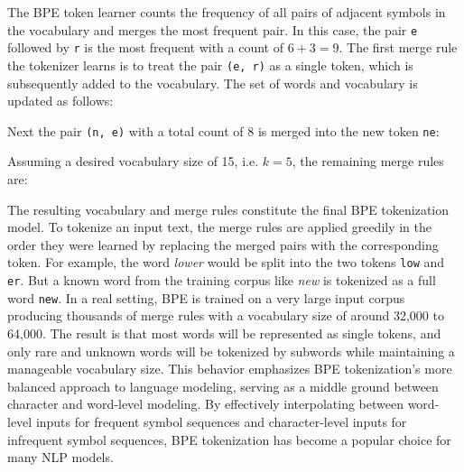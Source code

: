 The BPE token learner counts the frequency of all pairs of adjacent symbols in
the vocabulary and merges the most frequent pair. In this case, the pair
\texttt{e} followed by \texttt{r} is the most frequent with a count of $6 + 3 =
9$. The first merge rule the tokenizer learns is to treat the pair \texttt{(e,
r)} as a single token, which is subsequently added to the vocabulary. The set of
words and vocabulary is updated as follows:

\hspace{2cm} 

Next the pair \texttt{(n, e)} with a total count of 8 is merged into the new
token \texttt{ne}:

\hspace{2cm} 

Assuming a desired vocabulary size of 15, i.e. $k = 5$, the remaining merge
rules are:

\begin{center}
    
\end{center}

The resulting vocabulary and merge rules constitute the final BPE tokenization
model. To tokenize an input text, the merge rules are applied greedily in the
order they were learned by replacing the merged pairs with the corresponding
token. For example, the word \textit{lower} would be split into the two tokens
\texttt{low} and \texttt{er}. But a known word from the training corpus like
\textit{new} is tokenized as a full word \texttt{new}. In a real setting, BPE is
trained on a very large input corpus producing thousands of merge rules with a
vocabulary size of around 32,000 to 64,000. The result is that most words will
be represented as single tokens, and only rare and unknown words will be
tokenized by subwords while maintaining a manageable vocabulary size. This
behavior emphasizes BPE tokenization's more balanced approach to language
modeling, serving as a middle ground between character and word-level modeling.
By effectively interpolating between word-level inputs for frequent symbol
sequences and character-level inputs for infrequent symbol sequences, BPE
tokenization has become a popular choice for many NLP models.

